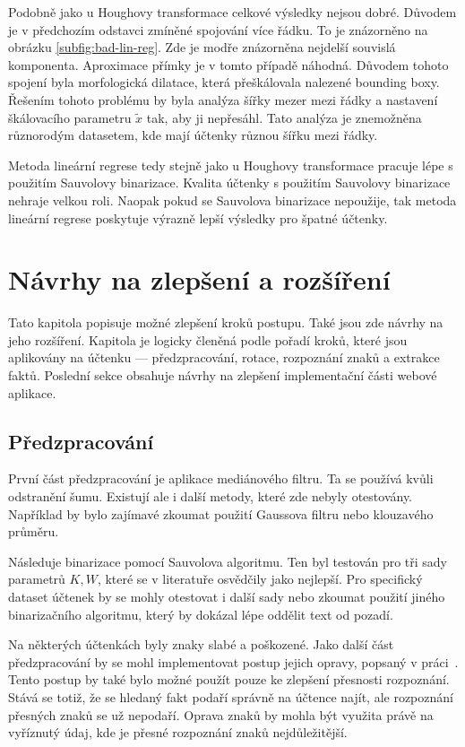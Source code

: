 \documentclass[thesis=B,czech]{FITthesis}[2019/12/23]
\begin{document}
Podobně jako u Houghovy transformace celkové výsledky nejsou dobré. Důvodem je v předchozím odstavci zmíněné spojování více řádku. To je znázorněno na obrázku \ref{subfig:bad-lin-reg}. Zde je modře znázorněna nejdelší souvislá komponenta. Aproximace přímky je v tomto případě náhodná. Důvodem tohoto spojení byla morfologická dilatace, která přeškálovala nalezené bounding boxy. Řešením tohoto problému by byla analýza šířky mezer mezi řádky a nastavení škálovacího parametru $\tilde{x}$ tak, aby ji nepřesáhl. Tato analýza je znemožněna různorodým datasetem, kde mají účtenky různou šířku mezi řádky.

Metoda lineární regrese tedy stejně jako u Houghovy transformace pracuje lépe s použitím Sauvolovy binarizace. Kvalita účtenky s použitím Sauvolovy binarizace nehraje velkou roli. Naopak pokud se Sauvolova binarizace nepoužije, tak metoda lineární regrese poskytuje výrazně lepší výsledky pro špatné účtenky.

\chapter{Návrhy na zlepšení a rozšíření}
\label{chapter:navrhy-na-zlepseni}
Tato kapitola popisuje možné zlepšení kroků postupu. Také jsou zde návrhy na jeho rozšíření. Kapitola je logicky členěná podle pořadí kroků, které jsou aplikovány na účtenku — předzpracování, rotace, rozpoznání znaků a extrakce faktů. Poslední sekce obsahuje návrhy na zlepšení implementační části webové aplikace.

\section{Předzpracování}
První část předzpracování je aplikace mediánového filtru. Ta se používá kvůli odstranění šumu. Existují ale i další metody, které zde nebyly otestovány. Například by bylo zajímavé zkoumat použití Gaussova filtru nebo klouzavého průměru.

Následuje binarizace pomocí Sauvolova algoritmu. Ten byl testován pro tři sady parametrů $K,W$, které se v literatuře osvědčily jako nejlepší. Pro specifický dataset účtenek by se mohly otestovat i další sady nebo zkoumat použití jiného binarizačního algoritmu, který by dokázal lépe oddělit text od pozadí.

Na některých účtenkách byly znaky slabé a poškozené. Jako další část předzpracování by se mohl implementovat postup jejich opravy, popsaný v prá\-ci~\cite{Camps2016}. Tento postup by také bylo možné použít pouze ke zlepšení přesnosti rozpoznání. Stává se totiž, že se hledaný fakt podaří správně na účtence najít, ale rozpoznání přesných znaků se už nepodaří. Oprava znaků by mohla být využita právě na vyříznutý údaj, kde je přesné rozpoznání znaků nejdůležitější.
\end{document}
